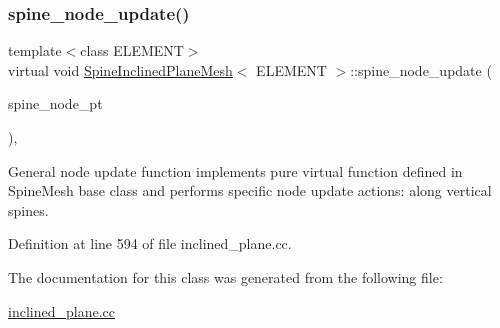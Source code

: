\subsubsection{\texorpdfstring{spine\+\_\+node\+\_\+update()}{spine\_node\_update()}}
{\footnotesize\ttfamily template$<$class E\+L\+E\+M\+E\+NT$>$ \\
virtual void \hyperlink{classSpineInclinedPlaneMesh}{Spine\+Inclined\+Plane\+Mesh}$<$ E\+L\+E\+M\+E\+NT $>$\+::spine\+\_\+node\+\_\+update (\begin{DoxyParamCaption}\item[{Spine\+Node $\ast$}]{spine\+\_\+node\+\_\+pt }\end{DoxyParamCaption})\hspace{0.3cm}{\ttfamily [inline]}, {\ttfamily [virtual]}}



General node update function implements pure virtual function defined in Spine\+Mesh base class and performs specific node update actions\+: along vertical spines. 



Definition at line 594 of file inclined\+\_\+plane.\+cc.



The documentation for this class was generated from the following file\+:\begin{DoxyCompactItemize}
\item 
\hyperlink{inclined__plane_8cc}{inclined\+\_\+plane.\+cc}\end{DoxyCompactItemize}
